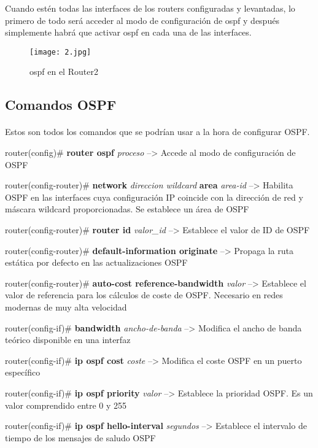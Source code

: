 \documentclass[a4paper,11pt]{article}
\begin{document}
Cuando estén todas las interfaces de los routers configuradas y levantadas, lo primero de todo será acceder al modo de configuración de ospf y después simplemente habrá que activar ospf en cada una de las interfaces.

\begin{figure}[ht!]
  \begin{center}
    \texttt{[image: 2.jpg]}
    \label{fig:}
    \caption{ospf en el Router2}
  \end{center}
\end{figure}


\subsection{Comandos OSPF}
\paragraph{  }
Estos son todos los comandos que se podrían usar a la hora de configurar OSPF.

router(config)\# \textbf{router ospf} \textit{proceso} --> Accede al modo de configuración de OSPF

router(config-router)\# \textbf{network} \textit{direccion wildcard} \textbf{area} \textit{area-id} --> Habilita OSPF en las interfaces cuya configuración IP coincide con la dirección de red y máscara wildcard proporcionadas. Se establece un área de OSPF


router(config-router)\# \textbf{router id} \textit{valor\_id} --> Establece el valor de ID de OSPF

router(config-router)\# \textbf{default-information originate} --> Propaga la ruta estática por defecto en las actualizaciones OSPF

router(config-router)\# \textbf{auto-cost reference-bandwidth} \textit{valor} --> Establece el valor de referencia para los cálculos de coste de OSPF. Necesario en redes modernas de muy alta velocidad

router(config-if)\# \textbf{bandwidth} \textit{ancho-de-banda} --> Modifica el ancho de banda teórico disponible en una interfaz

router(config-if)\# \textbf{ip ospf cost} \textit{coste} --> Modifica el coste OSPF en un puerto específico

router(config-if)\# \textbf{ip ospf priority} \textit{valor} --> Establece la prioridad OSPF. Es un valor comprendido entre 0 y 255

router(config-if)\# \textbf{ip ospf hello-interval} \textit{segundos} --> Establece el intervalo de tiempo de los mensajes de saludo OSPF
\end{document}
